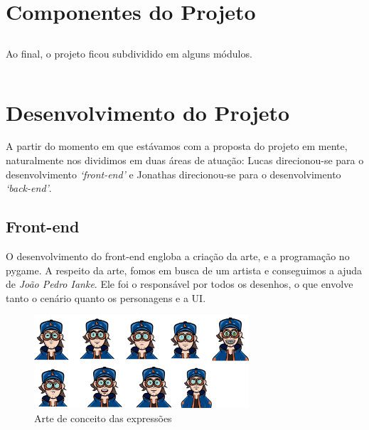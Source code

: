 \documentclass[a4paper]{article}
\begin{document}
    \section{Componentes do Projeto}
    \subsection{}
        Ao final, o projeto ficou subdividido em alguns módulos.
        
        \begin{table}[h]
            \center
            \begin{tabular}{|c|c|} \hline

            \end{tabular}
        \end{table}

    \section{Desenvolvimento do Projeto}
        
        A partir do momento em que estávamos com a proposta do projeto em mente,
        naturalmente nos dividimos em duas áreas de atuação: Lucas direcionou-se
        para o desenvolvimento \emph{`front-end'} e Jonathas direcionou-se para
        o desenvolvimento \emph{`back-end'}.

    \subsection{Front-end}

        O desenvolvimento do front-end engloba a criação da arte, e a
        programação no pygame.  A respeito da arte, fomos em busca de um
        artista e conseguimos a ajuda de \emph{João Pedro Ianke}. Ele foi
        o responsável por todos os desenhos, o que envolve tanto o cenário
        quanto os personagens e a UI.

        \begin{figure}[!h]
            \center
            \includegraphics[width=8cm]{spreadsheet.png}
            \caption{Arte de conceito das expressões}
        \end{figure}
        
\end{document}
